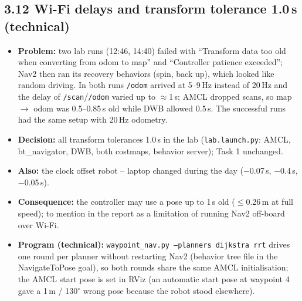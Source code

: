\documentclass[10pt]{article}
\newcommand{\pkg}[1]{\texttt{#1}}
\begin{document}
\subsection*{3.12 Wi-Fi delays and transform tolerance 1.0\,s (technical)}
\begin{itemize}
  \item \textbf{Problem:} two lab runs (12:46, 14:40) failed with ``Transform data too old when converting from odom to map'' and ``Controller patience exceeded''; Nav2 then ran its recovery behaviors (spin, back up), which looked like random driving. In both runs \pkg{/odom} arrived at 5--9\,Hz instead of 20\,Hz and the delay of \pkg{/scan}/\pkg{/odom} varied up to $\approx$1\,s; AMCL dropped scans, so map $\rightarrow$ odom was 0.5--0.85\,s old while DWB allowed 0.5\,s. The successful runs had the same setup with 20\,Hz odometry.
  \item \textbf{Decision:} all transform tolerances 1.0\,s in the lab (\pkg{lab.launch.py}: AMCL, bt\_navigator, DWB, both costmaps, behavior server); Task 1 unchanged.
  \item \textbf{Also:} the clock offset robot -- laptop changed during the day ($-$0.07\,s, $-$0.4\,s, $-$0.05\,s).
  \item \textbf{Consequence:} the controller may use a pose up to 1\,s old ($\leq$0.26\,m at full speed); to mention in the report as a limitation of running Nav2 off-board over Wi-Fi.
  \item \textbf{Program (technical):} \pkg{waypoint\_nav.py --planners dijkstra rrt} drives one round per planner without restarting Nav2 (behavior tree file in the NavigateToPose goal), so both rounds share the same AMCL initialisation; the AMCL start pose is set in RViz (an automatic start pose at waypoint 4 gave a 1\,m / 130$^\circ$ wrong pose because the robot stood elsewhere).
\end{itemize}
\end{document}
